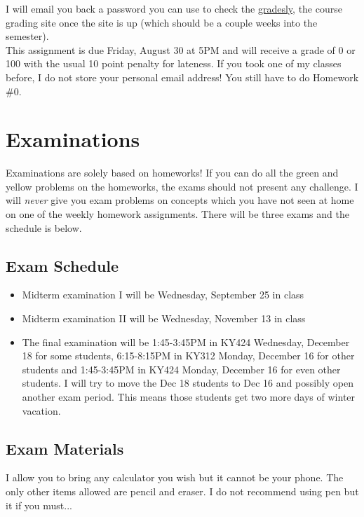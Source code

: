 \documentclass[12pt]{article}
\begin{document}
I will email you back a password you can use to check the \href{http://gradesly.com}{gradesly}, the course grading site once the site is up (which should be a couple weeks into the semester). \\

This assignment is due Friday, August 30 at 5PM and will receive a grade of 0 or 100 with the usual 10 point penalty for lateness. If you took one of my classes before, I do not store your personal email address! You still have to do Homework \#0.


\section*{Examinations}

Examinations are solely based on homeworks! If you can do all the green and yellow problems on the homeworks, the exams should not present any challenge. I will \textit{never} give you exam problems on concepts which you have not seen at home on one of the weekly homework assignments. There will be three exams and the schedule is below.

\subsection*{Exam Schedule}\label{subsec:exam_schedule}

\begin{itemize}
\itemsep -0.0em 
\item Midterm examination I will be Wednesday, September 25 in class
\item Midterm examination II will be Wednesday, November 13 in class
\item The final examination will be 1:45-3:45PM in KY424 Wednesday, December 18 for some students, 6:15-8:15PM in KY312 Monday, December 16 for other students and 1:45-3:45PM in KY424 Monday, December 16 for even other students. I will try to move the Dec 18 students to Dec 16 and possibly open another exam period. This means those students get two more days of winter vacation. 
\end{itemize}

\subsection*{Exam Materials}

I allow you to bring any calculator you wish but it cannot be your phone. The only other items allowed are pencil and eraser. I do not recommend using pen but it if you must...
\end{document}
